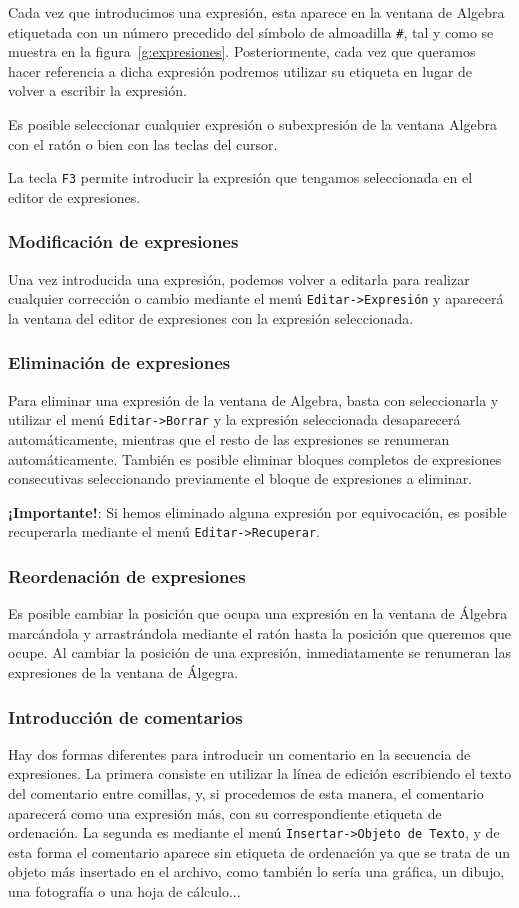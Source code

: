 Cada vez que introducimos una expresión, esta aparece en la ventana
de Algebra etiquetada con un número precedido del símbolo de
almoadilla \verb"#", tal y como se muestra en la
figura~\ref{g:expresiones}. Posteriormente, cada vez que queramos
hacer referencia a dicha expresión podremos utilizar su etiqueta en
lugar de volver a escribir la expresión.

Es posible seleccionar cualquier expresión o subexpresión de la
ventana Algebra con el ratón o bien con las teclas del cursor.

La tecla \texttt{F3} permite introducir la expresión que tengamos
seleccionada en el editor de expresiones.

\subsubsection*{Modificación de expresiones}
Una vez introducida una expresión, podemos volver a editarla para
realizar cualquier corrección o cambio mediante el menú
\texttt{Editar->Expresión} y aparecerá la ventana del editor de
expresiones con la expresión seleccionada.
\subsubsection*{Eliminación de expresiones}
Para eliminar una expresión de la ventana de Algebra, basta con
seleccionarla y utilizar el menú \texttt{Editar->Borrar} y la
expresión seleccionada desaparecerá automáticamente, mientras que el
resto de las expresiones se renumeran automáticamente. También es
posible eliminar bloques completos de expresiones consecutivas
seleccionando previamente el bloque de expresiones a eliminar.

\textbf{¡Importante!}: Si hemos eliminado alguna expresión por
equivocación, es posible recuperarla mediante el menú
\texttt{Editar->Recuperar}.

\subsubsection*{Reordenación de expresiones}
Es posible cambiar la posición que ocupa una expresión en la ventana
de Álgebra marcándola y arrastrándola mediante el ratón hasta la
posición que queremos que ocupe. Al cambiar la posición de una
expresión, inmediatamente se renumeran las expresiones de la ventana
de Álgegra.

\subsubsection*{Introducción de comentarios}
Hay dos formas diferentes para introducir un comentario en la
secuencia de expresiones. La primera consiste en utilizar la línea
de edición escribiendo el texto del comentario entre comillas, y,
si procedemos de esta manera, el comentario aparecerá como una
expresión más, con su correspondiente etiqueta de ordenación. La
segunda es mediante el menú \texttt{Insertar->Objeto de Texto}, y
de esta forma el comentario aparece sin etiqueta de ordenación ya
que se trata de un objeto más insertado en el archivo, como
también lo sería una gráfica, un dibujo, una fotografía o una hoja
de cálculo...

